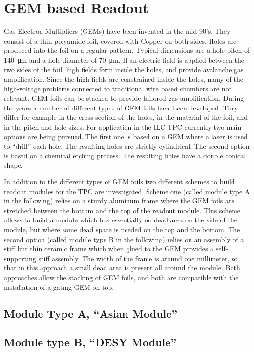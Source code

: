\section{GEM based Readout}\label{chap:TPC_sec:standard_gems}

Gas Electron Multipliers (GEMs) \cite{Sauli1997531} have been invented in the mid 90's. They consist of a thin polyamide foil, covered with Copper on both sides. Holes are produced into the foil on a regular pattern. Typical dimensions are a hole pitch of \SI{140}{\micro m} and a hole diameter of \SI{70}{\micro m}. If an electric field is applied between the two sides of the foil, high fields form inside the holes, and provide avalanche gas amplification. Since the high fields are constrained inside the holes, many of the high-voltage problems connected to traditional wire based chambers are not relevant. GEM foils can be stacked to provide tailored gas amplification. During the years a number of different types of GEM foils have been developed. They differ for example in the cross section of the holes, in the material of the foil, and in the pitch and hole sizes. For application in the ILC TPC currently two main options are being pursued. The first one is based on a GEM where a laser is used to ``drill'' each hole.
The resulting holes are
strictly cylindrical. The second option is based on a chemical etching process. The resulting holes have a double conical shape.

In addition to the different types of GEM foils two different schemes to build readout modules for the TPC are investigated. Scheme one (called module type A in the following) relies on a sturdy aluminum frame where the GEM foils are stretched between the bottom and the top of the readout module. This scheme allows to build a module which has essentially no dead area on the side of the module, but where some dead space is needed on the top and the bottom. The second option (called module type B in the following) relies on an assembly of a stiff but thin ceramic frame which when glued to the GEM provides a self-supporting stiff assembly. The width of the frame is around one millimeter, so that in this approach a small dead area is present all around the module. Both approaches allow the stacking of GEM foils, and both are compatible with the installation of a gating GEM on top.

\subsection{Module Type A, ``Asian Module''}

\subsection{Module type B, ``DESY Module''}

